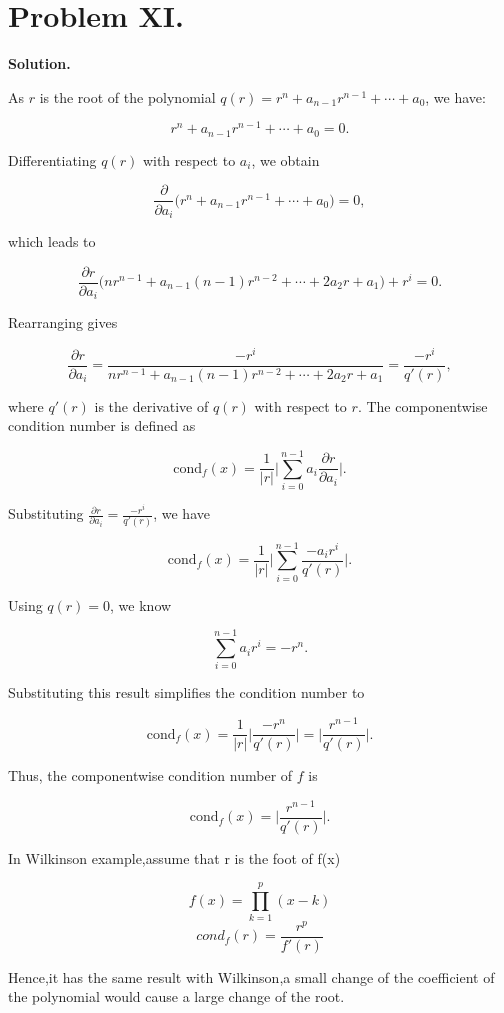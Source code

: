 \documentclass[a4paper]{article}
\begin{document}
\section*{Problem XI.}

\textbf{Solution.}

As \(r\) is the root of the polynomial \(q(r) = r^n + a_{n-1}r^{n-1} + \cdots + a_0\), we have:

\[
r^n + a_{n-1}r^{n-1} + \cdots + a_0 = 0.
\]

Differentiating \( q(r) \) with respect to \( a_i \), we obtain 

\[
\frac{\partial}{\partial a_i} \big(r^n + a_{n-1}r^{n-1} + \cdots + a_0\big) = 0,
\]

which leads to 

\[
\frac{\partial r}{\partial a_i} \big(nr^{n-1} + a_{n-1}(n-1)r^{n-2} + \cdots + 2a_2r + a_1\big) + r^i = 0.
\]

Rearranging gives 

\[
\frac{\partial r}{\partial a_i} = \frac{-r^i}{nr^{n-1} + a_{n-1}(n-1)r^{n-2} + \cdots + 2a_2r + a_1} = \frac{-r^i}{q'(r)},
\]

where \( q'(r) \) is the derivative of \( q(r) \) with respect to \( r \). The componentwise condition number is defined as 

\[
\text{cond}_f(x) = \frac{1}{|r|} \bigg| \sum_{i=0}^{n-1} a_i \frac{\partial r}{\partial a_i} \bigg|.
\]

Substituting \( \frac{\partial r}{\partial a_i} = \frac{-r^i}{q'(r)} \), we have 

\[
\text{cond}_f(x) = \frac{1}{|r|} \bigg| \sum_{i=0}^{n-1} \frac{-a_i r^i}{q'(r)} \bigg|.
\]

Using \( q(r) = 0 \), we know 

\[
\sum_{i=0}^{n-1} a_i r^i = -r^n.
\]

Substituting this result simplifies the condition number to 

\[
\text{cond}_f(x) = \frac{1}{|r|} \bigg| \frac{-r^n}{q'(r)} \bigg| = \bigg| \frac{r^{n-1}}{q'(r)} \bigg|.
\]

Thus, the componentwise condition number of \( f \) is 

\[
\text{cond}_f(x) = \bigg| \frac{r^{n-1}}{q'(r)} \bigg|.
\]

In Wilkinson example,assume that r is the foot of f(x)

$$f(x)=\prod_{k=1}^p(x-k)$$
$$cond_f(r)=\frac{r^p}{f'(r)}$$

Hence,it has the same result with Wilkinson,a small change of the coefficient
of the polynomial would cause a large change of the root.
\end{document}
